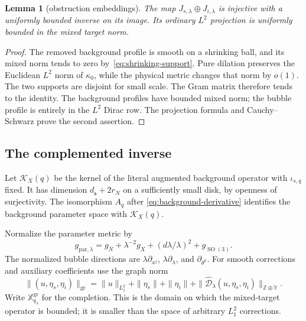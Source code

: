 \documentclass[11pt]{amsart}
\newtheorem{lemma}[theorem]{Lemma}
\theoremstyle{definition}
\theoremstyle{remark}
\theoremstyle{plain}
\newcommand{\cK}{\mathcal{K}}
\newcommand{\SO}{\operatorname{SO}}
\begin{document}
\begin{lemma}[obstruction embeddings]\label{lem:matched-obstruction}
The map $J_{s,\lambda}\oplus J_{i,\lambda}$ is injective with a uniformly
bounded inverse on its image.  Its ordinary $L^2$ projection is uniformly
bounded in the mixed target norm.
\end{lemma}
\begin{proof}
The removed background profile is smooth on a shrinking ball, and its
mixed norm tends to zero by~\eqref{eq:shrinking-support}.  Pure dilation
preserves the Euclidean $L^2$ norm of $\kappa_0$, while the physical metric
changes that norm by $o(1)$.  The two supports are disjoint for small
scale.  The Gram matrix therefore tends to the identity.  The background
profiles have bounded mixed norm; the bubble profile is entirely in the
$L^2$ Dirac row.  The projection formula and Cauchy--Schwarz prove the
second assertion.
\end{proof}

\subsection{The complemented inverse}
Let $\cK_X(q)$ be the kernel of the literal augmented background operator
with $\iota_{s,q}$ fixed.  It has dimension $d_{\mathfrak s}+2r_N$ on a
sufficiently small disk, by openness of surjectivity.  The isomorphism $A_q$ after
\eqref{eq:background-derivative} identifies the background parameter
space with $\cK_X(q)$.

Normalize the parameter metric by
\begin{equation}\label{eq:parameter-metric}
 g_{\mathrm{par},\lambda}=g_{\overline N}+\lambda^{-2}g_X
 +(d\lambda/\lambda)^2+g_{\SO(3)}.
\end{equation}
The normalized bubble directions are $\lambda\partial_{x^j}$,
$\lambda\partial_\lambda$, and $\partial_{\theta^k}$.
For smooth corrections and auxiliary coefficients use the graph norm
\begin{equation}\label{eq:graph-domain}
 \|(u,\eta_s,\eta_i)\|_{\mathrm{gr}}
 =\|u\|_{L^2_1}+\|\eta_s\|+\|\eta_i\|
 +\|\widehat{\mathscr D}_\lambda(u,\eta_s,\eta_i)\|_{
 \mathbb Z\oplus\mathbb Y}.
\end{equation}
Write $\mathbb X^{\mathrm{gr}}_{q_\lambda}$ for the completion.  This is
the domain on which the mixed-target operator is bounded; it is smaller
than the space of arbitrary $L^2_1$ corrections.
\end{document}
